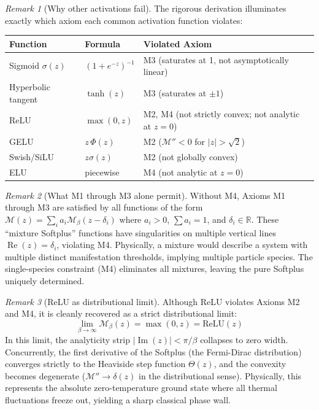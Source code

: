 \documentclass[12pt]{article}
\newcommand{\R}{\mathbb{R}}
\newcommand{\Man}{\mathcal{M}}
\DeclareMathOperator{\ReOp}{Re}
\DeclareMathOperator{\ImOp}{Im}
\theoremstyle{definition}
\theoremstyle{remark}
\newtheorem{remark}{Remark}[section]
\begin{document}
\begin{remark}[Why other activations fail]
\label{rem:exclusion}
The rigorous derivation illuminates exactly which axiom each common activation function violates:
\begin{center}
\renewcommand{\arraystretch}{1.3}
\begin{tabular}{lll}
\toprule
\textbf{Function} & \textbf{Formula} & \textbf{Violated Axiom} \\
\midrule
Sigmoid $\sigma(z)$ & $(1+e^{-z})^{-1}$ & M3 (saturates at 1, not asymptotically linear) \\
Hyperbolic tangent & $\tanh(z)$ & M3 (saturates at $\pm 1$) \\
ReLU & $\max(0, z)$ & M2, M4 (not strictly convex; not analytic at $z=0$) \\
GELU & $z\,\Phi(z)$ & M2 ($\Man'' < 0$ for $|z| > \sqrt{2}$) \\
Swish/SiLU & $z\sigma(z)$ & M2 (not globally convex) \\
ELU & piecewise & M4 (not analytic at $z = 0$) \\
\bottomrule
\end{tabular}
\end{center}
\end{remark}

\begin{remark}[What M1 through M3 alone permit]
\label{rem:m123}
Without M4, Axioms M1 through M3 are satisfied by all functions of the form $\Man(z) = \sum_i a_i \Man_\beta(z - \delta_i)$ where $a_i > 0$, $\sum a_i = 1$, and $\delta_i \in \R$. These ``mixture Softplus'' functions have singularities on multiple vertical lines $\ReOp(z) = \delta_i$, violating M4. Physically, a mixture would describe a system with multiple distinct manifestation thresholds, implying multiple particle species. The single-species constraint (M4) eliminates all mixtures, leaving the pure Softplus uniquely determined.
\end{remark}

\begin{remark}[ReLU as distributional limit]
\label{rem:relu_limit}
Although ReLU violates Axioms M2 and M4, it is cleanly recovered as a strict distributional limit:
\begin{equation}
    \lim_{\beta \to \infty} \Man_\beta(z) = \max(0, z) = \text{ReLU}(z)
\end{equation}
In this limit, the analyticity strip $|\ImOp(z)| < \pi/\beta$ collapses to zero width. Concurrently, the first derivative of the Softplus (the Fermi-Dirac distribution) converges strictly to the Heaviside step function $\Theta(z)$, and the convexity becomes degenerate ($\Man'' \to \delta(z)$ in the distributional sense). Physically, this represents the absolute zero-temperature ground state where all thermal fluctuations freeze out, yielding a sharp classical phase wall.
\end{remark}
\end{document}
